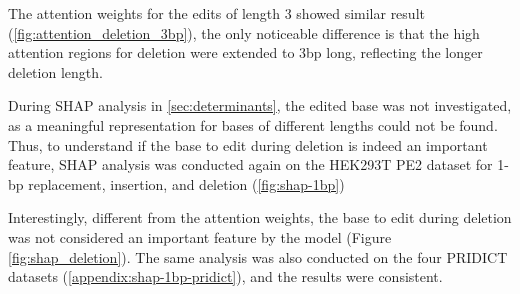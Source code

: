The attention weights for the edits of length 3 showed similar result (\autoref{fig:attention_deletion_3bp}), the only noticeable difference is that the high attention regions for deletion were extended to 3bp long, reflecting the longer deletion length.

During SHAP analysis in \autoref{sec:determinants}, the edited base was not investigated, as a meaningful representation for bases of different lengths could not be found. Thus, to understand if the base to edit during deletion is indeed an important feature, SHAP analysis was conducted again on the HEK293T PE2 dataset for 1-bp replacement, insertion, and deletion (\autoref{fig:shap-1bp})


Interestingly, different from the attention weights, the base to edit during deletion was not considered an important feature by the model (Figure \ref{fig:shap_deletion}). The same analysis was also conducted on the four PRIDICT datasets (\autoref{appendix:shap-1bp-pridict}), and the results were consistent. 